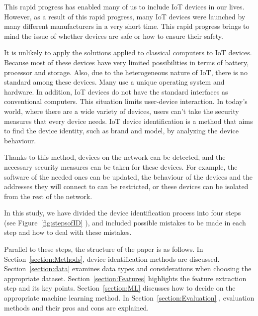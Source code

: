 \documentclass[journal]{IEEEtran}
\begin{document}
This rapid progress has enabled many of us to include IoT devices in our lives. However, as a result of this rapid progress, many IoT devices were launched by many different manufacturers in a very short time. This rapid progress brings to mind the issue of whether devices are safe or how to ensure their safety.


It is unlikely to apply the solutions applied to classical computers to IoT devices. Because most of these devices have very limited possibilities in terms of battery, processor and storage. Also, due to the heterogeneous nature of IoT, there is no standard among these devices. Many use a unique operating system and hardware. In addition, IoT devices do not have the standard interfaces as conventional computers. This situation limits user-device interaction. In today's world, where there are a wide variety of devices, users can't take the security measures that every device needs. IoT device identification is a method that aims to find the device identity, such as brand and model, by analyzing the device behaviour.

Thanks to this method, devices on the network can be detected, and the necessary security measures can be taken for these devices. For example, the software of the needed ones can be updated, the behaviour of the devices and the addresses they will connect to can be restricted, or these devices can be isolated from the rest of the network. 

In this study, we have divided the device identification process into four steps (see Figure~\ref{fig:stepsofID} ), and included possible mistakes to be made in each step and how to deal with these mistakes.

Parallel to these steps, the structure of the paper is as follows.
In Section~\ref{section:Methods}, device identification methods are discussed. Section~\ref{section:data} examines data types and considerations when choosing the appropriate dataset. Section~\ref{section:Features}  highlights the feature extraction step and its key points. Section~\ref{section:ML}   discusses how to decide on the appropriate machine learning method. In Section~\ref{section:Evaluation}  , evaluation methods and their pros and cons are explained.


\end{document}
